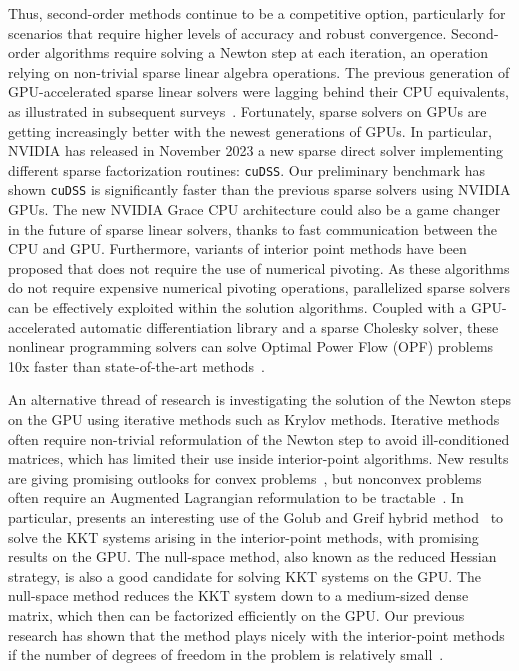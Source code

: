 Thus, second-order methods continue to be a competitive option, particularly
for scenarios that require higher levels of accuracy and robust convergence.
Second-order algorithms require solving a Newton step at each
iteration, an operation relying on non-trivial sparse linear algebra operations.
The previous generation of GPU-accelerated sparse linear
solvers were lagging behind their CPU equivalents, as illustrated in
subsequent surveys~\cite{tasseff2019exploring,swirydowicz2021linear}.
Fortunately, sparse solvers on GPUs are getting increasingly better with the newest
generations of GPUs.
In particular, NVIDIA has released in November 2023
a new sparse direct solver implementing different sparse factorization routines: {\tt cuDSS}. Our
preliminary benchmark has shown {\tt cuDSS} is significantly
faster than the previous sparse solvers using NVIDIA GPUs.
The new NVIDIA Grace CPU architecture could also be a game changer in the future of sparse linear solvers, thanks to fast communication between the CPU and GPU.
Furthermore, variants of interior point methods have been proposed
that does not require the use of numerical pivoting.
As these algorithms do not require expensive numerical pivoting
operations, parallelized sparse solvers can be effectively exploited
within the solution algorithms.
Coupled with a GPU-accelerated automatic differentiation library and a
sparse Cholesky solver, these nonlinear programming solvers can solve
Optimal Power Flow (OPF) problems 10x faster than state-of-the-art
methods~\cite{shin2023accelerating}.

An alternative thread of research is investigating the solution of the Newton steps
on the GPU using iterative methods such as Krylov methods.
Iterative methods often require non-trivial reformulation of the Newton step to avoid
ill-conditioned matrices, which has limited their use inside interior-point
algorithms. New results are giving promising outlooks for convex problems~\cite{ghannad2022linear},
but nonconvex problems often require an Augmented Lagrangian reformulation
to be tractable~\cite{cao2016augmented,regev2023hykkt}. In particular,
\cite{regev2023hykkt} presents an interesting use of the Golub and Greif
hybrid method~\cite{golub2003solving} to solve the KKT systems arising in
the interior-point methods, with promising results on the GPU.
The null-space method, also known as the reduced Hessian strategy,
is also a good candidate for solving KKT systems on the GPU.
The null-space method reduces the KKT system down to
a medium-sized dense matrix, which then can be factorized efficiently on the GPU.
Our previous research has shown that the method plays nicely with the interior-point
methods if the number of degrees of freedom in the problem is relatively small~\cite{pacaud2022condensed}.

